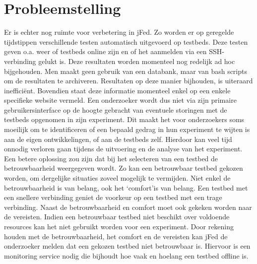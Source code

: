 \section{Probleemstelling}
\npar
Er is echter nog ruimte voor verbetering in jFed. Zo worden er op geregelde tijdstippen verschillende testen automatisch uitgevoerd op testbeds. Deze testen geven o.a. weer of testbeds online zijn en of het aanmelden via een SSH-verbinding gelukt is. Deze resultaten worden momenteel nog redelijk ad hoc bijgehouden. Men maakt geen gebruik van een databank, maar van bash scripts om de resultaten te archiveren. Resultaten op deze manier bijhouden, is uiteraard ineffici\"ent. Bovendien staat deze informatie momenteel enkel op een enkele specifieke website vermeld. 
\npar
Een onderzoeker wordt dus niet via zijn primaire gebruikersinterface op de hoogte gebracht van eventuele storingen met de testbeds opgenomen in zijn experiment. Dit maakt het voor onderzoekers soms moeilijk om te identificeren of een bepaald gedrag in hun experiment te wijten is aan de eigen ontwikkelingen, of aan de testbeds zelf. Hierdoor kan veel tijd onnodig verloren gaan tijdens de uitvoering en de analyse van het experiment. Een betere oplossing zou zijn dat bij het selecteren van een testbed de betrouwbaarheid weergegeven wordt. Zo kan een betrouwbaar testbed gekozen worden, om dergelijke situaties zoveel mogelijk te vermijden.
\npar
Niet enkel de betrouwbaarheid is van belang, ook het \lq comfort\rq is van belang. Een testbed met een snellere verbinding geniet de voorkeur op een testbed met een trage verbinding. Naast de betrouwbaarheid en comfort moet ook gekeken worden naar de vereisten. Indien een betrouwbaar testbed niet beschikt over voldoende resources kan het niet gebruikt worden voor een experiment.
\npar
Door rekening houden met de betrouwbaarheid, het comfort en de vereisten kan jFed de onderzoeker melden dat een gekozen testbed niet betrouwbaar is. Hiervoor is een monitoring service nodig die bijhoudt hoe vaak en hoelang een testbed offline is.